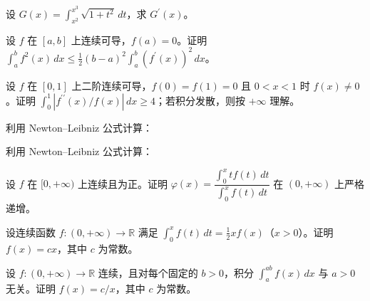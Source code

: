 \noindent\begin{minipage}{\textwidth}
设 $G(x)=\int_{x^2}^{x^3}\sqrt{1+t^2}\,dt$，求 $G^{\prime}(x)$。
\end{minipage}\par\vfill
\noindent\begin{minipage}{\textwidth}
设 $f$ 在 $[a,b]$ 上连续可导，$f(a)=0$。证明 $\int_a^b f^2(x)\,dx\le\frac12(b-a)^2\int_a^b(f^{\prime}(x))^2\,dx$。
\end{minipage}\par\vfill
\newpage
\noindent\begin{minipage}{\textwidth}
设 $f$ 在 $[0,1]$ 上二阶连续可导，$f(0)=f(1)=0$ 且 $0<x<1$ 时 $f(x)\ne0$。证明 $\int_0^1|f^{\prime\prime}(x)/f(x)|\,dx\ge4$；若积分发散，则按 $+\infty$ 理解。
\end{minipage}\par\vfill
\noindent\begin{minipage}{\textwidth}
利用 Newton--Leibniz 公式计算：
\end{minipage}\par\vfill
\noindent\begin{minipage}{\textwidth}
利用 Newton--Leibniz 公式计算：
\end{minipage}\par\vfill
\newpage
\noindent\begin{minipage}{\textwidth}
设 $f$ 在 $[0,+\infty)$ 上连续且为正。证明 $\varphi(x)=\dfrac{\int_0^x tf(t)\,dt}{\int_0^x f(t)\,dt}$ 在 $(0,+\infty)$ 上严格递增。
\end{minipage}\par\vfill
\noindent\begin{minipage}{\textwidth}
设连续函数 $f:(0,+\infty)\to\mathbb R$ 满足 $\int_0^x f(t)\,dt=\frac12xf(x)$（$x>0$）。证明 $f(x)=cx$，其中 $c$ 为常数。
\end{minipage}\par\vfill
\noindent\begin{minipage}{\textwidth}
设 $f:(0,+\infty)\to\mathbb R$ 连续，且对每个固定的 $b>0$，积分 $\int_a^{ab}f(x)\,dx$ 与 $a>0$ 无关。证明 $f(x)=c/x$，其中 $c$ 为常数。
\end{minipage}\par\vfill

